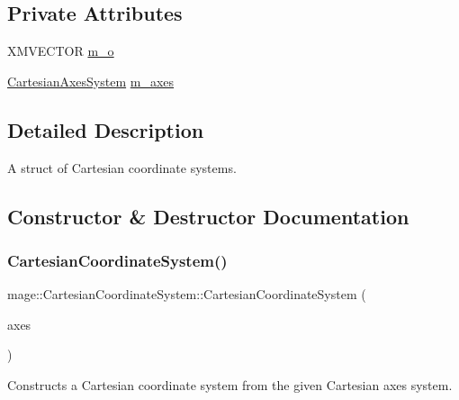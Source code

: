 \subsection*{Private Attributes}
\begin{DoxyCompactItemize}
\item 
X\+M\+V\+E\+C\+T\+OR \hyperlink{structmage_1_1_cartesian_coordinate_system_a1ea373bb91be991ee221a2ce1e02be2b}{m\+\_\+o}
\item 
\hyperlink{structmage_1_1_cartesian_axes_system}{Cartesian\+Axes\+System} \hyperlink{structmage_1_1_cartesian_coordinate_system_acf7b8cf35026f5fa8fc11a126b96b055}{m\+\_\+axes}
\end{DoxyCompactItemize}


\subsection{Detailed Description}
A struct of Cartesian coordinate systems. 

\subsection{Constructor \& Destructor Documentation}
\hypertarget{structmage_1_1_cartesian_coordinate_system_a3f4a3309daccc818f06400a44f70b09b}{}\label{structmage_1_1_cartesian_coordinate_system_a3f4a3309daccc818f06400a44f70b09b} 
\subsubsection{\texorpdfstring{Cartesian\+Coordinate\+System()}{CartesianCoordinateSystem()}\hspace{0.1cm}{\footnotesize\ttfamily [1/3]}}
{\footnotesize\ttfamily mage\+::\+Cartesian\+Coordinate\+System\+::\+Cartesian\+Coordinate\+System (\begin{DoxyParamCaption}\item[{const \hyperlink{structmage_1_1_cartesian_axes_system}{Cartesian\+Axes\+System} \&}]{axes }\end{DoxyParamCaption})\hspace{0.3cm}{\ttfamily [explicit]}}

Constructs a Cartesian coordinate system from the given Cartesian axes system.


